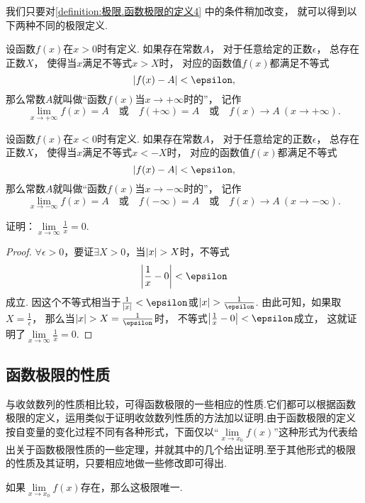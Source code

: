 我们只要对\cref{definition:极限.函数极限的定义4} 中的条件稍加改变，
就可以得到以下两种不同的极限定义.
\begin{definition}\label{definition:极限.函数极限的定义5}
设函数\(f(x)\)在\(x > 0\)时有定义.
如果存在常数\(A\)，
对于任意给定的正数\(\epsilon\)，
总存在正数\(X\)，
使得当\(x\)满足不等式\(x > X\)时，
对应的函数值\(f(x)\)都满足不等式\[
\abs{f(x) - A} < \epsilon,
\]那么常数\(A\)就叫做“函数\(f(x)\)当\(x \to +\infty\)时的”，
记作\[
\lim\limits_{x \to +\infty} f(x) = A
\quad\text{或}\quad
f(+\infty) = A
\quad\text{或}\quad
f(x) \to A\ (x \to +\infty).
\]
\end{definition}

\begin{definition}\label{definition:极限.函数极限的定义6}
设函数\(f(x)\)在\(x < 0\)时有定义.
如果存在常数\(A\)，
对于任意给定的正数\(\epsilon\)，
总存在正数\(X\)，
使得当\(x\)满足不等式\(x < -X\)时，
对应的函数值\(f(x)\)都满足不等式\[
\abs{f(x) - A} < \epsilon,
\]那么常数\(A\)就叫做“函数\(f(x)\)当\(x \to -\infty\)时的”，
记作\[
\lim\limits_{x \to -\infty} f(x) = A
\quad\text{或}\quad
f(-\infty) = A
\quad\text{或}\quad
f(x) \to A\ (x \to -\infty).
\]
\end{definition}

\begin{example}
\def\l{\lim\limits_{x\to\infty}}
证明：\(\l \frac{1}{x} = 0\).
\begin{proof}
\(\forall\epsilon>0\)，要证\(\exists X > 0\)，当\(\abs{x}>X\)时，不等式\[
\abs{\frac{1}{x}-0}<\epsilon
\]成立.
因这个不等式相当于\(\frac{1}{\abs{x}}<\epsilon\)或\(\abs{x}>\frac{1}{\epsilon}\).
由此可知，如果取\(X=\frac{1}{\epsilon}\)，
那么当\(\abs{x}>X=\frac{1}{\epsilon}\)时，
不等式\(\abs{\frac{1}{x}-0}<\epsilon\)成立，
这就证明了\(\l \frac{1}{x} = 0\).
\end{proof}
\end{example}

\subsection{函数极限的性质}
与收敛数列的性质相比较，可得函数极限的一些相应的性质.它们都可以根据函数极限的定义，运用类似于证明收敛数列性质的方法加以证明.由于函数极限的定义按自变量的变化过程不同有各种形式，下面仅以“\(\lim\limits_{x \to x_0}f(x)\)”这种形式为代表给出关于函数极限性质的一些定理，并就其中的几个给出证明.至于其他形式的极限的性质及其证明，只要相应地做一些修改即可得出.

\begin{theorem}[函数极限的唯一性]\label{theorem:极限.函数极限的唯一性}
如果\(\lim\limits_{x \to x_0}f(x)\)存在，那么这极限唯一.
\end{theorem}

